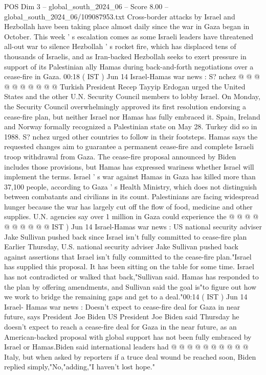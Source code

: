 \begin{textsample}{POS Dim 3 – global\_south\_2024\_06 – Score 8.00 – global\_south\_2024\_06/109087953.txt}
Cross-border attacks by Israel and Hezbollah have been taking place almost daily since the war in Gaza began in October.
This week ' s escalation comes as some Israeli leaders have threatened all-out war to silence Hezbollah ' s rocket fire, which has displaced tens of thousands of Israelis, and as Iran-backed Hezbollah seeks to exert pressure in support of its Palestinian ally Hamas during back-and-forth negotiations over a cease-fire in Gaza. 00:18 ( IST ) Jun 14 Israel-Hamas war news : S? nchez @ @ @ @ @ @ @ @ @ @ Turkish President Recep Tayyip Erdogan urged the United States and the other U.N.
Security Council members to lobby Israel.
On Monday, the Security Council overwhelmingly approved its first resolution endorsing a cease-fire plan, but neither Israel nor Hamas has fully embraced it.
Spain, Ireland and Norway formally recognized a Palestinian state on May 28.
Turkey did so in 1988.
S? nchez urged other countries to follow in their footsteps.
Hamas says the requested changes aim to guarantee a permanent cease-fire and complete Israeli troop withdrawal from Gaza.
The cease-fire proposal announced by Biden includes those provisions, but Hamas has expressed wariness whether Israel will implement the terms.
Israel ' s war against Hamas in Gaza has killed more than 37,100 people, according to Gaza ' s Health Ministry, which does not distinguish between combatants and civilians in its count.
Palestinians are facing widespread hunger because the war has largely cut off the flow of food, medicine and other supplies.
U.N. agencies say over 1 million in Gaza could experience the @ @ @ @ @ @ @ @ @ @ IST ) Jun 14 Israel-Hamas war news : US national security adviser Jake Sullivan pushed back since Israel isn't fully committed to cease-fire plan Earlier Thursday, U.S. national security adviser Jake Sullivan pushed back against assertions that Israel isn't fully committed to the cease-fire plan."Israel has supplied this proposal.
It has been sitting on the table for some time.
Israel has not contradicted or walked that back,"Sullivan said.
Hamas has responded to the plan by offering amendments, and Sullivan said the goal is"to figure out how we work to bridge the remaining gaps and get to a deal."00:14 ( IST ) Jun 14 Israel- Hamas war news : Doesn't expect to cease-fire deal for Gaza in near future, says President Joe Biden US President Joe Biden said Thursday he doesn't expect to reach a cease-fire deal for Gaza in the near future, as an American-backed proposal with global support has not been fully embraced by Israel or Hamas.Biden said international leaders had @ @ @ @ @ @ @ @ @ @ Italy, but when asked by reporters if a truce deal wound be reached soon, Biden replied simply,"No,"adding,"I haven't lost hope."

\end{textsample}
